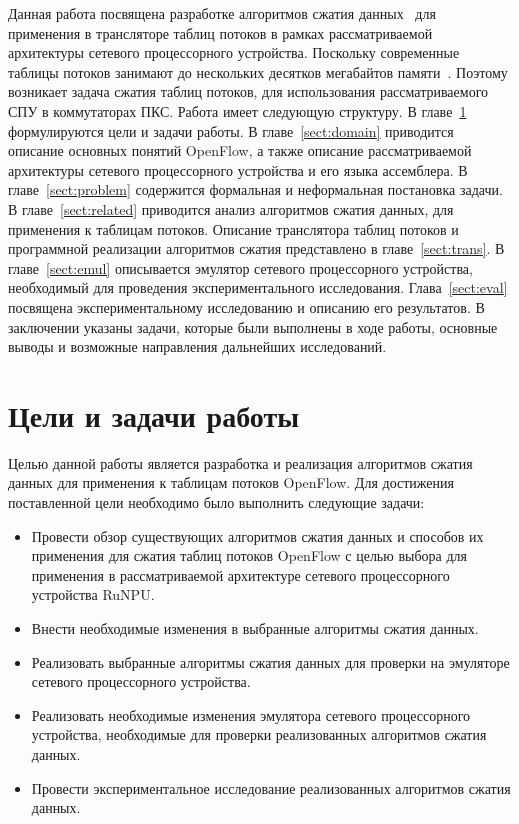 \documentclass[oneside,final,12pt]{extarticle}
\begin{document}
        Данная работа посвящена разработке алгоритмов сжатия данных~\cite{retvari2013compressing}
        для применения в трансляторе таблиц потоков в рамках рассматриваемой архитектуры 
        сетевого процессорного устройства. Поскольку современные таблицы потоков занимают до нескольких десятков 
        мегабайтов памяти~\cite{rottenstreich2016optimal}. 
        Поэтому возникает задача сжатия таблиц потоков, для использования рассматриваемого СПУ в коммутаторах ПКС.
        Работа имеет следующую структуру. В главе~\ref{sect:goals} формулируются цели и задачи работы. 
        В главе~\ref{sect:domain} приводится описание основных понятий OpenFlow, а также описание рассматриваемой
        архитектуры сетевого процессорного устройства и его языка ассемблера. 
        В главе~\ref{sect:problem} содержится формальная и неформальная постановка задачи. 
        В главе~\ref{sect:related} приводится анализ алгоритмов сжатия данных, для применения к таблицам потоков.
        Описание транслятора таблиц потоков и программной реализации алгоритмов сжатия представлено в главе~\ref{sect:trans}.
        В главе~\ref{sect:emul} описывается эмулятор сетевого процессорного устройства, необходимый для проведения экспериментального исследования.
        Глава~\ref{sect:eval} посвящена экспериментальному исследованию и описанию его результатов. В заключении указаны задачи, 
        которые были выполнены в ходе работы, основные выводы и возможные направления дальнейших исследований.

    \section{Цели и задачи работы}
    \label{sect:goals}
        Целью данной работы является разработка и реализация алгоритмов сжатия данных для применения к таблицам потоков OpenFlow. Для достижения поставленной цели
        необходимо было выполнить следующие задачи:
        \begin{itemize}
            \item Провести обзор существующих алгоритмов сжатия данных и способов их применения для сжатия таблиц потоков OpenFlow с целью выбора 
                для применения в рассматриваемой архитектуре сетевого процессорного устройства RuNPU.
            \item Внести необходимые изменения в выбранные алгоритмы сжатия данных.
            \item Реализовать выбранные алгоритмы сжатия данных для проверки на эмуляторе сетевого процессорного устройства.
            \item Реализовать необходимые изменения эмулятора сетевого процессорного устройства, необходимые для проверки реализованных алгоритмов
                сжатия данных.
            \item Провести экспериментальное исследование реализованных алгоритмов сжатия данных.
        \end{itemize}
\end{document}
